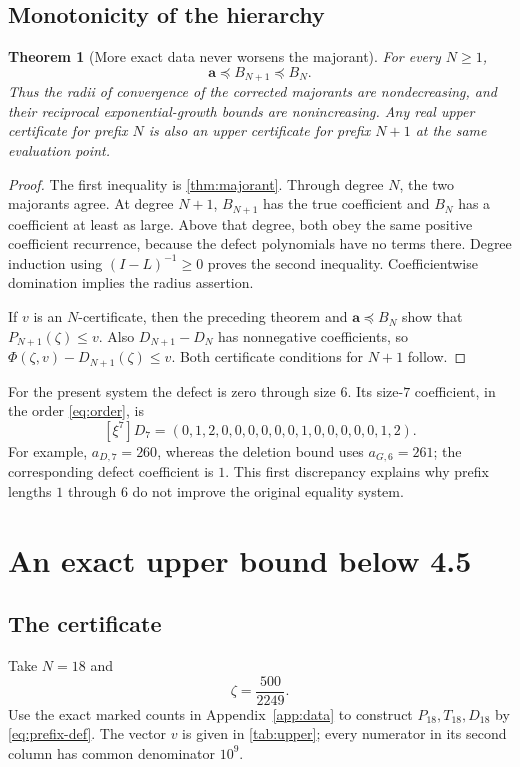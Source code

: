 \documentclass[11pt,a4paper]{article}
\newtheorem{theorem}{Theorem}[section]
\theoremstyle{definition}
\theoremstyle{remark}
\newcommand{\bA}{\boldsymbol a}
\begin{document}
\subsection{Monotonicity of the hierarchy}
\begin{theorem}[More exact data never worsens the majorant]\label{thm:nested}
For every $N\geq1$,
\[
 \bA\preceq B_{N+1}\preceq B_N.
\]
Thus the radii of convergence of the corrected majorants are nondecreasing,
and their reciprocal exponential-growth bounds are nonincreasing.
Any real upper certificate for prefix $N$ is also an upper certificate for
prefix $N+1$ at the same evaluation point.
\end{theorem}
\begin{proof}
The first inequality is \cref{thm:majorant}. Through degree $N$, the two
majorants agree. At degree $N+1$, $B_{N+1}$ has the true coefficient and
$B_N$ has a coefficient at least as large. Above that degree, both obey the
same positive coefficient recurrence, because the defect polynomials have
no terms there. Degree induction using $(I-L)^{-1}\geq0$ proves the second
inequality. Coefficientwise domination implies the radius assertion.

If $v$ is an $N$-certificate, then the preceding theorem and
$\bA\preceq B_N$ show that $P_{N+1}(\zeta)\leq v$.
Also $D_{N+1}-D_N$ has nonnegative coefficients, so
$\Phi(\zeta,v)-D_{N+1}(\zeta)\leq v$.
Both certificate conditions for $N+1$ follow.
\end{proof}

For the present system the defect is zero through size $6$. Its size-$7$
coefficient, in the order \eqref{eq:order}, is
\begin{equation}\label{eq:first-defect}
 [\xi^7]D_7=(0,1,2,0,0,0,0,0,0,1,0,0,0,0,0,1,2).
\end{equation}
For example, $a_{D,7}=260$, whereas the deletion bound uses
$a_{G,6}=261$; the corresponding defect coefficient is $1$.
This first discrepancy explains why prefix lengths $1$ through $6$ do not
improve the original equality system.

\section{An exact upper bound below 4.5}
\label{sec:numeric}

\subsection{The certificate}
Take $N=18$ and
\[
 \zeta=\frac{500}{2249}.
\]
Use the exact marked counts in Appendix~\ref{app:data} to construct
$P_{18},T_{18},D_{18}$ by \eqref{eq:prefix-def}.
The vector $v$ is given in \cref{tab:upper}; every numerator in its second
column has common denominator $10^9$.
\end{document}
